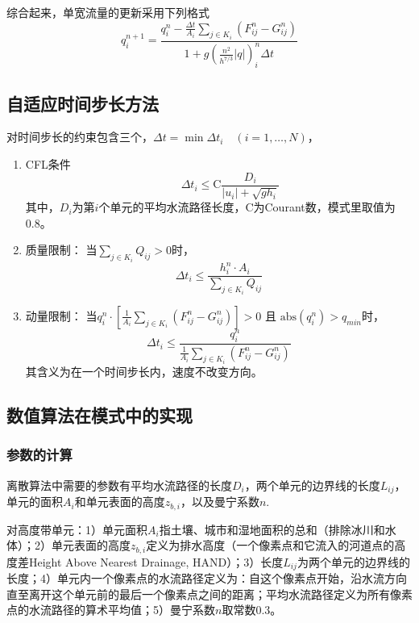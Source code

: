 综合起来，单宽流量的更新采用下列格式
\begin{equation}
q^{n+1}_i = \frac{q^n_i - \frac{\Delta t}{A_i}\sum_{j\in K_i} \left(F^n_{ij} - G^n_{ij}\right)}{1 + g \left(\frac{n^2}{h^{7/3}} \left|q\right|\right)^n_i \Delta t}
\end{equation}

\subsection{自适应时间步长方法}
对时间步长的约束包含三个，$\Delta t = \min \Delta t_i \quad (i=1, \ldots, N)$，
\begin{enumerate}
\item CFL条件
\begin{equation}
\qquad \Delta t_i \leqslant \mathrm{C}\frac{ D_i }{\left| u_{i}\right| + \sqrt{gh_{i}}}
\end{equation}
其中，$D_i$为第$i$个单元的平均水流路径长度，C为Courant数，模式里取值为0.8。
\item 质量限制：
当$\sum_{j\in K_i} Q_{ij}>0$时，
  \begin{equation}
 \Delta t_i \leqslant \frac{h^n_i\cdot A_i}{\sum_{j\in K_i} Q_{ij}}
 \end{equation}
\item 动量限制：
当$q^n_i \cdot \left[ \frac{1}{A_i}\sum_{j\in K_i} \left(F^n_{ij} - G^n_{ij} \right)\right] > 0$ 且 $\mathrm{abs}\left(q^n_i\right) > q_{min}$时，
  \begin{equation}
 \Delta t_i \leqslant \frac{q^n_i}{\frac{1}{A_i}\sum_{j\in K_i} \left(F^n_{ij} - G^n_{ij} \right)}
 \end{equation}
其含义为在一个时间步长内，速度不改变方向。
 \end{enumerate}

\subsection{数值算法在模式中的实现}

\subsubsection{参数的计算}
离散算法中需要的参数有平均水流路径的长度$D_i$，两个单元的边界线的长度$L_{ij}$，单元的面积$A_i$和单元表面的高度$z_{b,i}$，以及曼宁系数$n$.

对高度带单元：1）单元面积$A_i$指土壤、城市和湿地面积的总和（排除冰川和水体）；2）单元表面的高度$z_{b,i}$定义为排水高度（一个像素点和它流入的河道点的高度差Height Above Nearest Drainage, HAND）；3）长度$L_{ij}$为两个单元的边界线的长度；4）单元内一个像素点的水流路径定义为：自这个像素点开始，沿水流方向直至离开这个单元前的最后一个像素点之间的距离；平均水流路径定义为所有像素点的水流路径的算术平均值；5）曼宁系数$n$取常数$0.3$。

